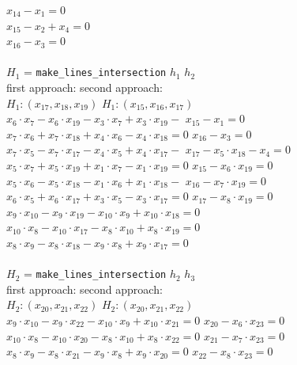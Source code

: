 \documentclass[final,1p,times,authoryear]{elsarticle}
\begin{document}
\begin{footnotesize}
\begin{tabbing}
\>\> $x_{14}  -  x_1 = 0$ \\
\>\> $x_{15}  -  x_2  +  x_4 = 0$ \\
\>\> $x_{16}  -  x_3 = 0$ \\
 \\
\> $H_1$ = {\tt make\_lines\_intersection} $h_1$ $h_2$ \\
\>\> first approach: \>\>second approach: \\
\>\> $H_1 : (x_{17}, x_{18}, x_{19})$  \>\> $H_1 : (x_{15}, x_{16}, x_{17})$ \\
\>\> $x_6\cdot x_7  -  x_6\cdot x_{19}  -  x_3\cdot x_7  +  x_3\cdot x_{19}  -$   \>\> $x_{15}  -  x_1 = 0$ \\
\>\>\> $x_7\cdot x_6  +  x_7\cdot x_{18}  +  x_4\cdot x_6  -  x_4\cdot x_{18} = 0$ \> $x_{16}  -  x_3 = 0$\\
\>\> $x_7\cdot x_5  -  x_7\cdot x_{17}  -  x_4\cdot x_5  +  x_4\cdot x_{17}  -$ \>\> $x_{17}  -  x_5\cdot x_{18}  -  x_4= 0$ \\
\>\>\> $x_5\cdot x_7  +  x_5\cdot x_{19}  +  x_1\cdot x_7  -  x_1\cdot x_{19} = 0$ \> $x_{15}  -  x_6\cdot x_{19} = 0$ \\
\>\> $x_5\cdot x_6  -  x_5\cdot x_{18}  -  x_1\cdot x_6  +  x_1\cdot x_{18}  -$ \>\> $x_{16}  -  x_7\cdot x_{19} = 0$ \\
\>\>\> $x_6\cdot x_5  +  x_6\cdot x_{17}  +  x_3\cdot x_5  -  x_3\cdot x_{17} = 0$ \> $x_{17}  -  x_8\cdot x_{19} = 0$ \\
\>\> $x_9\cdot x_{10}  -  x_9\cdot x_{19}  -  x_{10}\cdot x_9  +  x_{10}\cdot x_{18} = 0$ \\
\>\> $x_{10}\cdot x_8  -  x_{10}\cdot x_{17}  -  x_8\cdot x_{10}  +  x_8\cdot x_{19} = 0$ \\
\>\> $x_8\cdot x_9  -  x_8\cdot x_{18}  -  x_9\cdot x_8  +  x_9\cdot x_{17} = 0$ \\
\\
\> $H_2$ = {\tt make\_lines\_intersection} $h_2$ $h_3$ \\
\>\> first approach: \>\>second approach: \\
\>\> $H_2 : (x_{20}, x_{21}, x_{22})$  \>\> $H_2 : (x_{20}, x_{21}, x_{22})$ \\
\>\> $x_9\cdot x_{10}  -  x_9\cdot x_{22}  -  x_{10}\cdot x_9  +  x_{10}\cdot x_{21} = 0$ \>\>   $x_{20}  -  x_6\cdot x_{23} = 0$ \\
\>\> $x_{10}\cdot x_8  -  x_{10}\cdot x_{20}  -  x_8\cdot x_{10}  +  x_8\cdot x_{22} = 0$ \>\>   $x_{21}  -  x_7\cdot x_{23} = 0$ \\
\>\> $x_8\cdot x_9  -  x_8\cdot x_{21}  -  x_9\cdot x_8  +  x_9\cdot x_{20} = 0$ \>\>   $x_{22}  -  x_8\cdot x_{23} = 0$ \\

\end{tabbing}
\end{footnotesize}
\end{document}
